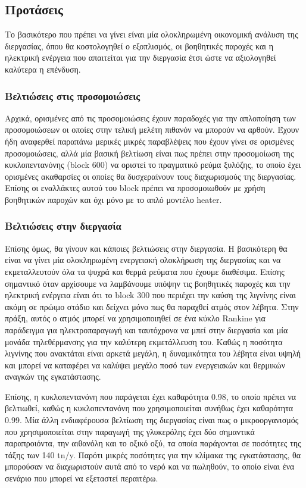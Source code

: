 \documentclass[11pt]{article}
\begin{document}
\subsection{Προτάσεις}
\label{sec:orgc0f7e79}
Το βασικότερο που πρέπει να γίνει είναι μία ολοκληρωμένη οικονομική ανάλυση της διεργασίας, όπου θα κοστολογηθεί ο εξοπλισμός, οι βοηθητικές παροχές και η ηλεκτρική ενέργεια που απαιτείται για την διεργασία έτσι ώστε να αξιολογηθεί καλύτερα η επένδυση.
\subsubsection{Βελτιώσεις στις προσομοιώσεις}
\label{sec:org2fe986e}
Αρχικά, ορισμένες από τις προσομοιώσεις έχουν παραδοχές για την απλοποίηση των προσομοιώσεων οι οποίες στην τελική μελέτη πιθανόν να μπορούν να αρθούν. Έχουν ήδη αναφερθεί παραπάνω μερικές μικρές παραβλέψεις που έχουν γίνει σε ορισμένες προσομοιώσεις, αλλά μία βασική βελτίωση είναι πως πρέπει στην προσομοίωση της κυκλοπεντανόνης (block 600) να οριστεί το πραγματικό ρεύμα ξυλόζης, το οποίο έχει ορισμένες ακαθαρσίες οι οποίες θα δυσχεραίνουν τους διαχωρισμούς της διεργασίας. Επίσης οι εναλλάκτες αυτού του block πρέπει να προσομοιωθούν με χρήση βοηθητικών παροχών και όχι μόνο με το απλό μοντέλο heater.

\subsubsection{Βελτιώσεις στην διεργασία}
\label{sec:org8e91853}
Επίσης όμως, θα γίνουν και κάποιες βελτιώσεις στην διεργασία. Η βασικότερη θα είναι να γίνει μία ολοκληρωμένη ενεργειακή ολοκλήρωση της διεργασίας και να εκμεταλλευτούν όλα τα ψυχρά και θερμά ρεύματα που έχουμε διαθέσιμα. Επίσης σημαντικό όταν αρχίσουμε να λαμβάνουμε υπόψην τις βοηθητικές παροχές και την ηλεκτρική ενέργεια είναι ότι το block 300 που περιέχει την καύση της λιγνίνης είναι ακόμη σε πρώιμο στάδιο και δείχνει μόνο πως θα παραχθεί ατμός στον λέβητα. Στην πράξη, αυτός ο ατμός μπορεί να χρησιμοποιηθεί σε ένα κύκλο Rankine για παράδειγμα για ηλεκτροπαραγωγή και ταυτόχρονα να μπεί στην διεργασία και μία μονάδα τηλεθέρμανσης για την καλύτερη εκμετάλλευση του. Καθώς η ποσότητα λιγνίνης που ανακτάται είναι αρκετά μεγάλη, η δυναμικότητα του λέβητα είναι υψηλή και μπορεί να καταφέρει να καλύψει μεγάλο ποσό των ενεργειακών και θερμικών αναγκών της εγκατάστασης.

Επίσης, η κυκλοπεντανόνη που παράγεται έχει καθαρότητα 0.98, το οποίο πρέπει να βελτιωθεί, καθώς η κυκλοπεντανόνη που χρησιμοποιείται συνήθως έχει καθαρότητα 0.99. Μία άλλη ενδιαφέρουσα βελτίωση της διεργασίας είναι πως ο μικροοργανισμός που χρησιμοποιείται στην παραγωγή της γλυκερόλης έχει δύο σημαντικά παραπροιόντα, την αιθανόλη και το οξικό οξύ, τα οποία παράγονται σε ποσότητες της τάξης των 140 tn/y. Παρότι μικρές ποσότητες για την κλίμακα της εγκατάστασης, θα μπορούσαν να διαχωριστούν αυτά από το νερό και να πωληθούν, το οποίο είναι ένα σενάριο που μπορεί να εξεταστεί περαιτέρω.
\end{document}
